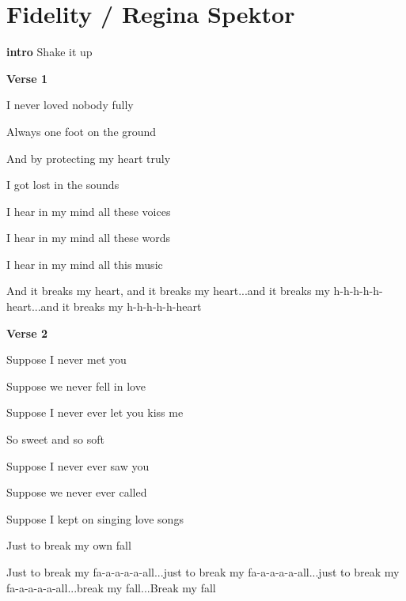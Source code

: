 \section{Fidelity / Regina Spektor}\label{ch:fidelity}
\Gmajor
\Cmajor
\Fmajor
\Aminor
\DmajorEasy

\textbf{intro}
Shake it up 

\textbf{Verse 1}
                    
I never loved nobody fully
                      
Always one foot on the ground
                          
And by protecting my heart truly
                
I got lost in the sounds
                           
I hear in my mind all these voices
                          
I hear in my mind all these words
                          
I hear in my mind all this music
                 
And it breaks my heart, and it breaks my heart...and it breaks my h-h-h-h-h-heart...and it breaks my h-h-h-h-h-heart

\textbf{Verse 2}
               
Suppose I never met you
                        
Suppose we never fell in love
                    
Suppose I never ever let you kiss me
              
So sweet and so soft
                   
Suppose I never ever saw you
                    
Suppose we never ever called
                        
Suppose I kept on singing love songs
                   
Just to break my own fall
                           
Just to break my fa-a-a-a-a-all...just to break my fa-a-a-a-a-all...just to break my fa-a-a-a-a-all...break my fall...Break my fall

